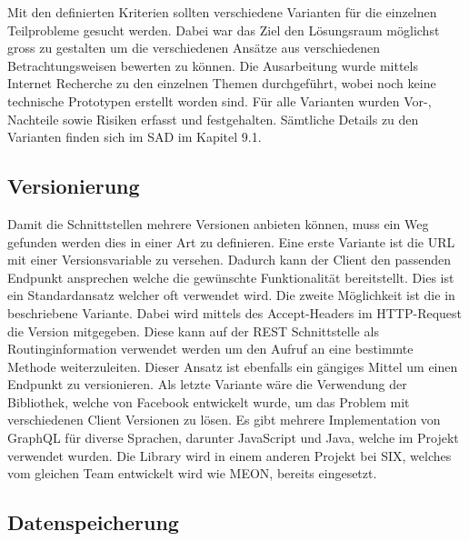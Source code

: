 Mit den definierten Kriterien sollten verschiedene Varianten für die einzelnen Teilprobleme gesucht werden. Dabei war das Ziel den Lösungsraum möglichst gross zu gestalten um die verschiedenen Ansätze aus verschiedenen Betrachtungsweisen bewerten zu können. Die Ausarbeitung wurde mittels Internet Recherche zu den einzelnen Themen durchgeführt, wobei noch keine technische Prototypen erstellt worden sind. Für alle Varianten wurden Vor-, Nachteile sowie Risiken erfasst und festgehalten. Sämtliche Details zu den Varianten finden sich im SAD im Kapitel 9.1.

\subsection{Versionierung}

Damit die Schnittstellen mehrere Versionen anbieten können, muss ein Weg gefunden werden dies in einer Art zu definieren. \newline Eine erste Variante ist die URL mit einer Versionsvariable zu versehen. Dadurch kann der Client den passenden Endpunkt ansprechen welche die gewünschte Funktionalität bereitstellt. Dies ist ein Standardansatz welcher oft verwendet wird. Die zweite Möglichkeit ist die in \cite{contneg} beschriebene Variante. Dabei wird mittels des Accept-Headers im HTTP-Request die Version mitgegeben. Diese kann auf der REST Schnittstelle als Routinginformation verwendet werden um den Aufruf an eine bestimmte Methode weiterzuleiten. Dieser Ansatz ist ebenfalls ein gängiges Mittel um einen Endpunkt zu versionieren. Als letzte Variante wäre die Verwendung der \cite{gq} Bibliothek, welche von Facebook entwickelt wurde, um das Problem mit verschiedenen Client Versionen zu lösen. Es gibt mehrere Implementation von GraphQL für diverse Sprachen, darunter JavaScript und Java, welche im Projekt verwendet wurden. Die Library wird in einem anderen Projekt bei SIX, welches vom gleichen Team entwickelt wird wie MEON, bereits eingesetzt.

\subsection{Datenspeicherung}

